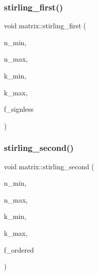 \subsubsection{\texorpdfstring{stirling\+\_\+first()}{stirling\_first()}}
{\footnotesize\ttfamily void matrix\+::stirling\+\_\+first (\begin{DoxyParamCaption}\item[{\mbox{\hyperlink{galois_8h_a09fddde158a3a20bd2dcadb609de11dc}{I\+NT}}}]{n\+\_\+min,  }\item[{\mbox{\hyperlink{galois_8h_a09fddde158a3a20bd2dcadb609de11dc}{I\+NT}}}]{n\+\_\+max,  }\item[{\mbox{\hyperlink{galois_8h_a09fddde158a3a20bd2dcadb609de11dc}{I\+NT}}}]{k\+\_\+min,  }\item[{\mbox{\hyperlink{galois_8h_a09fddde158a3a20bd2dcadb609de11dc}{I\+NT}}}]{k\+\_\+max,  }\item[{\mbox{\hyperlink{galois_8h_a09fddde158a3a20bd2dcadb609de11dc}{I\+NT}}}]{f\+\_\+signless }\end{DoxyParamCaption})}

\mbox{\label{classmatrix_a0e7366c1db2c447d83f71f2c369e8d1d}} 
\subsubsection{\texorpdfstring{stirling\+\_\+second()}{stirling\_second()}}
{\footnotesize\ttfamily void matrix\+::stirling\+\_\+second (\begin{DoxyParamCaption}\item[{\mbox{\hyperlink{galois_8h_a09fddde158a3a20bd2dcadb609de11dc}{I\+NT}}}]{n\+\_\+min,  }\item[{\mbox{\hyperlink{galois_8h_a09fddde158a3a20bd2dcadb609de11dc}{I\+NT}}}]{n\+\_\+max,  }\item[{\mbox{\hyperlink{galois_8h_a09fddde158a3a20bd2dcadb609de11dc}{I\+NT}}}]{k\+\_\+min,  }\item[{\mbox{\hyperlink{galois_8h_a09fddde158a3a20bd2dcadb609de11dc}{I\+NT}}}]{k\+\_\+max,  }\item[{\mbox{\hyperlink{galois_8h_a09fddde158a3a20bd2dcadb609de11dc}{I\+NT}}}]{f\+\_\+ordered }\end{DoxyParamCaption})}

\mbox{\label{classmatrix_ab806288c2dcb40b77b2dfc53ab09f74d}} 
